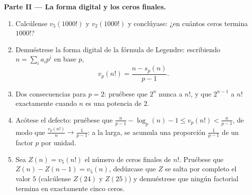 \begin{problem}
\medskip
\noindent\textbf{Parte II --- La forma digital y los ceros
finales.}
\begin{enumerate}[resume]
  \item Calcúlense $v_5(1000!)$ y $v_2(1000!)$ y conclúyase: ¿en
        cuántos ceros termina $1000!$?
  \item Demuéstrese la forma digital de la fórmula de Legendre:
        escribiendo $n = \sum_i a_i p^i$ en base $p$,
        \[
        v_p(n!) = \frac{n - s_p(n)}{p - 1} .
        \]
  \item Dos consecuencias para $p = 2$: pruébese que $2^n$ nunca
         a $n!$, y que $2^{n-1}$  a $n!$ exactamente
        cuando $n$ es una potencia de $2$.
  \item Acótese el defecto: pruébese que $\frac n{p-1} - \log_p(n) - 1
        \leq v_p(n!) < \frac n{p-1}$, de modo que
        $\frac{v_p(n!)}{n} \to \frac1{p-1}$: a la larga, se acumula
        una proporción $\frac1{p-1}$ de un factor $p$ por unidad.
  \item Sea $Z(n) = v_5(n!)$ el número de ceros finales de $n!$.
        Pruébese que $Z(n) - Z(n-1) = v_5(n)$, dedúzcase que $Z$ se
        salta por completo el valor $5$ (calcúlense $Z(24)$ y
        $Z(25)$) y demuéstrese que ningún factorial termina en
        exactamente cinco ceros.
\end{enumerate}


\end{problem}
